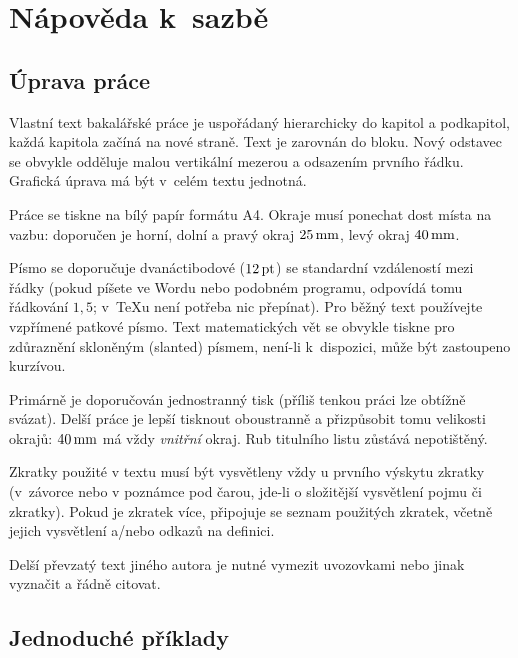 
\chapter{Nápověda k~sazbě}

\section{Úprava práce}

Vlastní text bakalářské práce je uspořádaný hierarchicky do kapitol a podkapitol,
každá kapitola začíná na nové straně. Text je zarovnán do bloku. Nový odstavec
se obvykle odděluje malou vertikální mezerou a odsazením prvního řádku. Grafická
úprava má být v~celém textu jednotná.

Práce se tiskne na bílý papír formátu A4. Okraje musí ponechat dost místa na vazbu:
doporučen je horní, dolní a pravý okraj $25\,\rm mm$, levý okraj $40\,\rm mm$. 

Písmo se doporučuje dvanáctibodové ($12\,\rm pt$) se standardní vzdáleností mezi řádky
(pokud píšete ve Wordu nebo podobném programu, odpovídá tomu řádkování $1,5$; v~\TeX{}u
není potřeba nic přepínat). Pro běžný text používejte vzpřímené patkové písmo.
Text matematických vět se obvykle tiskne pro zdůraznění skloněným (slanted) písmem,
není-li k~dispozici, může být zastoupeno kurzívou.

Primárně je doporučován jednostranný tisk (příliš tenkou práci lze obtížně svázat).
Delší práce je lepší tisknout oboustranně a přizpůsobit tomu velikosti okrajů:
$40\,\rm mm$ má vždy \emph{vnitřní} okraj. Rub titulního listu zůstává nepotištěný.

Zkratky použité v textu musí být vysvětleny vždy u prvního výskytu zkratky (v~závorce nebo
v poznámce pod čarou, jde-li o složitější vysvětlení pojmu či zkratky). Pokud je zkratek
více, připojuje se seznam použitých zkratek, včetně jejich vysvětlení a/nebo odkazů
na definici.

Delší převzatý text jiného autora je nutné vymezit uvozovkami nebo jinak vyznačit a řádně
citovat.

\section{Jednoduché příklady}



